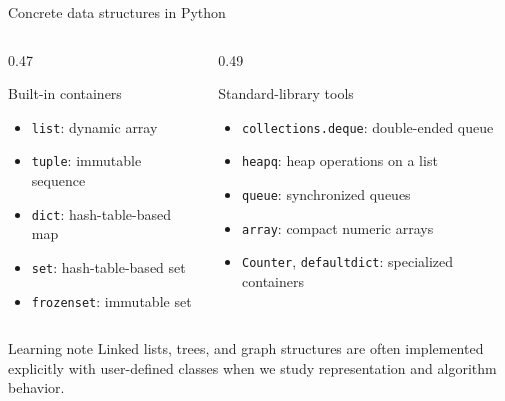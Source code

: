 \documentclass[aspectratio=169]{beamer}
\begin{document}
\begin{frame}{Concrete data structures in Python}
\small
\begin{columns}[T,onlytextwidth]
\begin{column}{0.47\textwidth}
\begin{exampleblock}{Built-in containers}
\begin{itemize}
  \item \texttt{list}: dynamic array
  \item \texttt{tuple}: immutable sequence
  \item \texttt{dict}: hash-table-based map
  \item \texttt{set}: hash-table-based set
  \item \texttt{frozenset}: immutable set
\end{itemize}
\end{exampleblock}
\end{column}
\begin{column}{0.49\textwidth}
\begin{block}{Standard-library tools}
\begin{itemize}
  \item \texttt{collections.deque}: double-ended queue
  \item \texttt{heapq}: heap operations on a list
  \item \texttt{queue}: synchronized queues
  \item \texttt{array}: compact numeric arrays
  \item \texttt{Counter}, \texttt{defaultdict}: specialized containers
\end{itemize}
\end{block}
\end{column}
\end{columns}
\begin{alertblock}{Learning note}
Linked lists, trees, and graph structures are often implemented explicitly with user-defined classes when we study representation and algorithm behavior.
\end{alertblock}
\end{frame}
\end{document}
